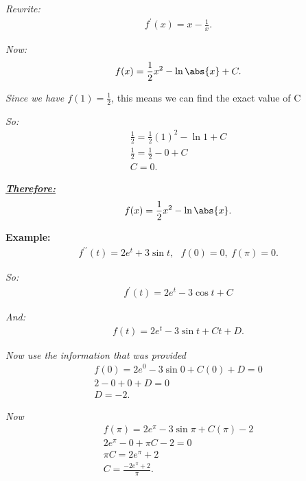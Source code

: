 \documentclass{report}
\begin{document}
  \bigbreak \noindent 
  \textit{Rewrite:}
  \begin{align*}
    f^{\prime}(x) = x -\frac{1}{x}
  .\end{align*}

  \bigbreak \noindent 
  \textit{Now:}
  \begin{align*}
    f(x) = \frac{1}{2}x^{2} - \ln{\abs{x}} + C
  .\end{align*}

  \bigbreak \noindent \bigbreak \noindent 
  \textit{Since we have $f(1) = \frac{1}{2}$}, this means we can find the exact value of C 

  \bigbreak \noindent 
  \textit{So:}
  \begin{align*}
    \frac{1}{2} = \frac{1}{2}(1)^{2} - \ln{1} + C \\
    \frac{1}{2 } = \frac{1}{2} - 0 + C \\
    C = 0
  .\end{align*}

  \bigbreak \noindent 
  \textbf{\textit{\underline{Therefore:}}}
  \begin{align*}
    f(x) = \frac{1}{2}x^{2}-\ln{\abs{x}}
  .\end{align*}

  \bigbreak \noindent 
  \begin{mdframed}
    \textbf{Example: }
    \begin{align*}
      f^{\prime\prime}(t) = 2e^{t}+3\sin{t}, \ \ \ f(0) = 0,\ f(\pi) = 0 
    .\end{align*}
  \end{mdframed}

  \bigbreak \noindent
  \textit{So:}
  \begin{align*}
    f^{\prime}(t) = 2e^{t} -3\cos{t} + C
  \end{align*}

  \bigbreak \noindent 
  \textit{And:}
  \begin{align*}
    f(t) = 2e^{t} -3\sin{t} + Ct + D
  .\end{align*}

  \bigbreak \noindent 
  \textit{Now use the information that was provided}
  \begin{align*}
    f(0) = 2e^{0} -3\sin{0} + C(0) + D = 0 \\
    2 - 0 + 0 + D = 0 \\
    D = -2
  .\end{align*}

  \bigbreak \noindent 
  \textit{Now}
  \begin{align*}
    f(\pi) = 2e^{\pi} -3\sin{\pi} + C(\pi) -2 \\
    2e^{\pi} -0+\pi C - 2 = 0 \\
    \pi C = 2e^{\pi} + 2 \\
    C = \frac{-2e^{\pi} + 2}{\pi}
  .\end{align*}
\end{document}
